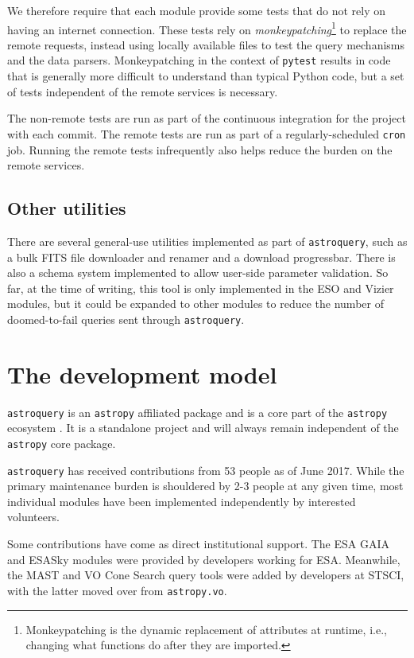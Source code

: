 \documentclass[twocolumn]{aastex61}
\newcommand{\package}[1]{\texttt{#1}\xspace}
\newcommand{\astroquery}{\package{astroquery}}
\begin{document}
We therefore require that each module provide some tests that do not rely on
having an internet connection.  These tests rely on
\emph{monkeypatching}\footnote{Monkeypatching is the dynamic replacement of
attributes at runtime, i.e., changing what functions do after they are
imported.} to
replace the remote requests, instead using locally available files to test the
query mechanisms and the data parsers.  Monkeypatching in the context of
\texttt{pytest} results in code that is generally more difficult to understand
than typical Python code, but a set of tests independent of the remote services
is necessary.

The non-remote tests are run as part of the continuous integration for the
project with each commit.  The remote tests are run as part of a
regularly-scheduled \texttt{cron} job.  Running the remote tests infrequently
also helps reduce the burden on the remote services.

\subsection{Other utilities}
There are several general-use utilities implemented as part of \astroquery, such
as a bulk FITS file downloader and renamer and a download progressbar.  There
is also a schema system implemented to allow user-side parameter validation.
So far, at the time of writing, this tool is only implemented in the ESO and
Vizier modules, but it could be expanded to other modules to reduce the number
of doomed-to-fail queries sent through \astroquery.

\section{The development model}
\label{sec:development}
\astroquery is an \texttt{astropy} affiliated package and is a core part of the
\texttt{astropy} ecosystem \citep{Astropy-Collaboration2013a}.  It is a
standalone project and will always remain independent of the \texttt{astropy}
core package.

\astroquery has received contributions from 53 people as of June 2017.
While the primary maintenance burden is shouldered by 2-3 people at any given time,
most individual modules have been implemented independently by interested volunteers.

Some contributions have come as direct institutional support.  The ESA GAIA and
ESASky modules were provided by developers working for ESA.  Meanwhile,
the MAST and VO Cone Search query tools were added by developers at STSCI,
with the latter moved over from \texttt{astropy.vo}.
\end{document}
